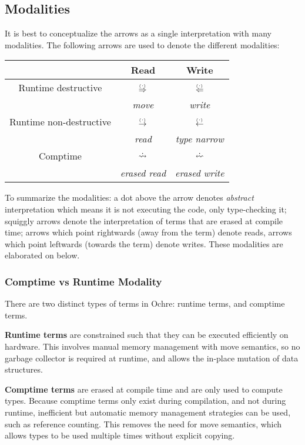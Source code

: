 \documentclass[12pt,twoside]{report}
\begin{document}
\subsection{Modalities}
\label{subsection:modalities}
It is best to conceptualize the arrows as a single interpretation with many modalities. The following arrows are used to denote the different modalities:

\begin{tabular}{c|c|c}
  & Read & Write \\
  \hline
  Runtime destructive & $\,\stackrel{_(._)}{\Rightarrow}\,$ & $\,\stackrel{_(._)}{\Leftarrow}\,$ \\
  & \textit{move} & \textit{write}\\
  Runtime non-destructive & $\,\stackrel{_(._)}{\rightarrow}\,$ & $\,\stackrel{_(._)}{\leftarrow}\,$ \\
  & \textit{read} & \textit{type narrow}\\
  Comptime & $\,\dot{\rightsquigarrow}\,$ &  $\erasedwritearrow$ \\
  & \textit{erased read} & \textit{erased write}\\
\end{tabular}

To summarize the modalities: a dot above the arrow denotes \textit{abstract} interpretation which means it is not executing the code, only type-checking it; squiggly arrows denote the interpretation of terms that are erased at compile time; arrows which point rightwards (away from the term) denote reads, arrows which point leftwards (towards the term) denote writes. These modalities are elaborated on below.

\subsubsection{Comptime vs Runtime Modality}
There are two distinct types of terms in Ochre: runtime terms, and comptime terms.

\textbf{Runtime terms} are constrained such that they can be executed efficiently on hardware. This involves manual memory management with move semantics, so no garbage collector is required at runtime, and allows the in-place mutation of data structures.

\textbf{Comptime terms} are erased at compile time and are only used to compute types. Because comptime terms only exist during compilation, and not during runtime, inefficient but automatic memory management strategies can be used, such as reference counting. This removes the need for move semantics, which allows types to be used multiple times without explicit copying.
\end{document}
